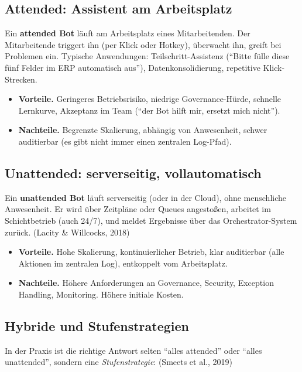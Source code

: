 \documentclass[11pt,a4paper,oneside]{article}
\newcommand{\fachbegriff}[1]{\textbf{#1}}
\newcommand{\quelle}[1]{{\footnotesize\color{lpGray}(#1)}}
\begin{document}
\subsection{Attended: Assistent am Arbeitsplatz}

Ein \fachbegriff{attended Bot} läuft am Arbeitsplatz eines Mitarbeitenden. Der Mitarbeitende triggert ihn (per Klick oder Hotkey), überwacht ihn, greift bei Problemen ein. Typische Anwendungen: Teilschritt-Assistenz (``Bitte fülle diese fünf Felder im ERP automatisch aus''), Datenkonsolidierung, repetitive Klick-Strecken.

\begin{itemize}
  \item \textbf{Vorteile.} Geringeres Betriebsrisiko, niedrige Governance-Hürde, schnelle Lernkurve, Akzeptanz im Team (``der Bot hilft mir, ersetzt mich nicht'').
  \item \textbf{Nachteile.} Begrenzte Skalierung, abhängig von Anwesenheit, schwer auditierbar (es gibt nicht immer einen zentralen Log-Pfad).
\end{itemize}

\subsection{Unattended: serverseitig, vollautomatisch}

Ein \fachbegriff{unattended Bot} läuft serverseitig (oder in der Cloud), ohne menschliche Anwesenheit. Er wird über Zeitpläne oder Queues angestoßen, arbeitet im Schichtbetrieb (auch 24/7), und meldet Ergebnisse über das Orchestrator-System zurück. \quelle{Lacity \& Willcocks, 2018}

\begin{itemize}
  \item \textbf{Vorteile.} Hohe Skalierung, kontinuierlicher Betrieb, klar auditierbar (alle Aktionen im zentralen Log), entkoppelt vom Arbeitsplatz.
  \item \textbf{Nachteile.} Höhere Anforderungen an Governance, Security, Exception Handling, Monitoring. Höhere initiale Kosten.
\end{itemize}

\subsection{Hybride und Stufenstrategien}

In der Praxis ist die richtige Antwort selten ``alles attended'' oder ``alles unattended'', sondern eine \emph{Stufenstrategie}: \quelle{Smeets et al., 2019}
\end{document}
